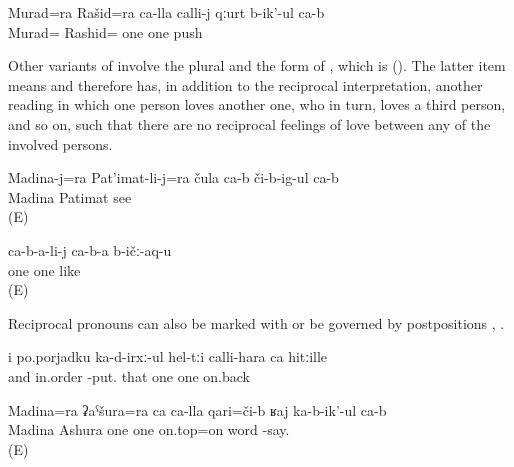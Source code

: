 \begin{exe}
	\ex	\label{ex:Murad and Rashid push each other.GEN}
	\gll	Murad=ra Rašid=ra ca-lla calli-j qːurt b-ik'-ul ca-b\\
	Murad= Rashid= one	one	push  \\
	\glt	{}
\end{exe}


Other variants of  involve the plural   and the  form of  , which is   (). The latter item means  and therefore  has, in addition to the reciprocal interpretation, another reading in which one person loves another one, who in turn, loves a third person, and so on, such that there are no reciprocal feelings of love between any of the involved persons.
%
\begin{exe}
		\ex	\label{ex:Madina and Patimat see each other@14a}
		\gll	Madina-j=ra	Pat'imat-li-j=ra	čula	ca-b 	či-b-ig-ul	ca-b\\
			Madina	Patimat			see	\\
		\glt	{} (E)

		\ex	\label{ex:(They) love each other@14b}
		\gll	ca-b-a-li-j	ca-b-a	b-ičː-aq-u\\
			one	one	like\\
		\glt	{} (E)

\end{exe}

Reciprocal pronouns can also be marked with   or be governed by postpositions , .
%
\begin{exe}
	\ex	\label{ex:and putting them in order one after the other}
	\gll	i	po.porjadku	ka-d-irxː-ul	hel-tːi	calli-hara	ca	hitːille\\
		and	in.order	-put.	that	one	one	on.back\\
	\glt	{}

	\ex	\label{ex:Madina and Ashura talk about each other}
	\gll	Madina=ra	ʡaˁšura=ra	ca	ca-lla	qari=či-b	ʁaj	ka-b-ik'-ul	ca-b\\
		Madina	Ashura	one	one	on.top=on	word	-say.	\\
	\glt	{} (E)
\end{exe}

